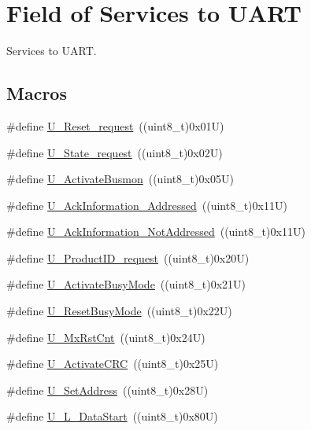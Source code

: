 \hypertarget{group___u_a_r_t___control___to}{}\section{Field of Services to U\+A\+RT}
\label{group___u_a_r_t___control___to}


Services to U\+A\+RT.  


\subsection*{Macros}
\begin{DoxyCompactItemize}
\item 
\#define \hyperlink{group___u_a_r_t___control___to_gab4e4e9acfc0b14566dee580c784d43c5}{U\+\_\+\+Reset\+\_\+request}~((uint8\+\_\+t)0x01\+U)
\item 
\#define \hyperlink{group___u_a_r_t___control___to_ga8dda3117e8869a900e5c5fe6f1b3a768}{U\+\_\+\+State\+\_\+request}~((uint8\+\_\+t)0x02\+U)
\item 
\#define \hyperlink{group___u_a_r_t___control___to_ga08302041c8622699abb02954c7942d33}{U\+\_\+\+Activate\+Busmon}~((uint8\+\_\+t)0x05\+U)
\item 
\#define \hyperlink{group___u_a_r_t___control___to_gadbcf1715439a76db9d5a416c772b7d6a}{U\+\_\+\+Ack\+Information\+\_\+\+Addressed}~((uint8\+\_\+t)0x11\+U)
\item 
\#define \hyperlink{group___u_a_r_t___control___to_gaa58e8b87e2c7afa233dc9143f9ed3000}{U\+\_\+\+Ack\+Information\+\_\+\+Not\+Addressed}~((uint8\+\_\+t)0x11\+U)
\item 
\#define \hyperlink{group___u_a_r_t___control___to_ga0fd706c07225b8d94a9e61178e9f1de2}{U\+\_\+\+Product\+I\+D\+\_\+request}~((uint8\+\_\+t)0x20\+U)
\item 
\#define \hyperlink{group___u_a_r_t___control___to_ga570dbcb6f3b58812795897e653cf6bcd}{U\+\_\+\+Activate\+Busy\+Mode}~((uint8\+\_\+t)0x21\+U)
\item 
\#define \hyperlink{group___u_a_r_t___control___to_gadddb4434f9a2e47ed320bc3bd39eec0c}{U\+\_\+\+Reset\+Busy\+Mode}~((uint8\+\_\+t)0x22\+U)
\item 
\#define \hyperlink{group___u_a_r_t___control___to_ga8898cd82315a21d0365c60b05a9450f9}{U\+\_\+\+Mx\+Rst\+Cnt}~((uint8\+\_\+t)0x24\+U)
\item 
\#define \hyperlink{group___u_a_r_t___control___to_gaa8801c2c6b23ad1b63c85b6f04b08c6d}{U\+\_\+\+Activate\+C\+RC}~((uint8\+\_\+t)0x25\+U)
\item 
\#define \hyperlink{group___u_a_r_t___control___to_ga1b727950a6079fa1f299e08204ad8923}{U\+\_\+\+Set\+Address}~((uint8\+\_\+t)0x28\+U)
\item 
\#define \hyperlink{group___u_a_r_t___control___to_ga5a6fadacef419bffab0a2ad00d4a4a3a}{U\+\_\+\+L\+\_\+\+Data\+Start}~((uint8\+\_\+t)0x80\+U)
\end{DoxyCompactItemize}


